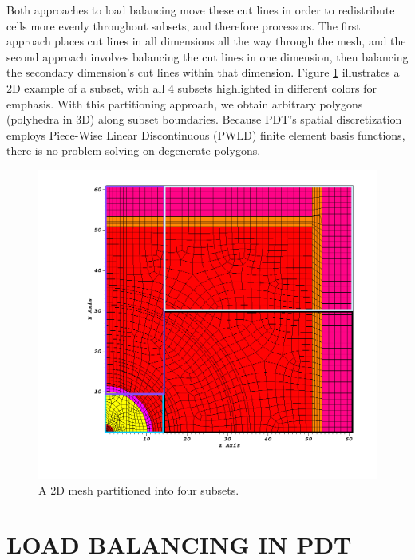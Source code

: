 \documentclass[letterpaper]{mandc2019}
\begin{document}
Both approaches to load balancing move these cut lines in order to redistribute cells more evenly throughout subsets, and therefore processors. The first approach places cut lines in all dimensions all the way through the mesh, and the second approach involves balancing the cut lines in one dimension, then balancing the secondary dimension's cut lines within that dimension. Figure \ref{subset_example} illustrates a 2D example of a subset, with all 4 subsets highlighted in different colors for emphasis. With this partitioning approach, we obtain arbitrary polygons (polyhedra in 3D) along subset boundaries. Because PDT's spatial discretization employs Piece-Wise Linear Discontinuous (PWLD)  finite element basis functions\cite{pwld_ragusa,pwld_teresa}, there is no problem solving on degenerate polygons. 
\begin{figure}[H]
\centering
\includegraphics[scale=0.5,trim={3cm 2cm 1cm 1cm},clip]{figures/subset_example.png}
\caption{A 2D mesh partitioned into four subsets.}
\label{subset_example}
\end{figure}

\section{LOAD BALANCING IN PDT}
\end{document}
